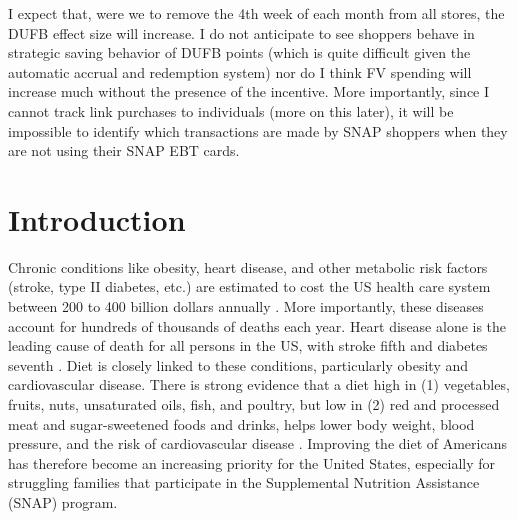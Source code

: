 \documentclass[12pt,letterpaperpaper,]{book}
\begin{document}
I expect that, were we to remove the 4th week of each month from all
stores, the DUFB effect size will increase. I do not anticipate to see
shoppers behave in strategic saving behavior of DUFB points (which is
quite difficult given the automatic accrual and redemption system) nor
do I think FV spending will increase much without the presence of the
incentive. More importantly, since I cannot track link purchases to
individuals (more on this later), it will be impossible to identify
which transactions are made by SNAP shoppers when they are not using
their SNAP EBT cards.

\section*{Introduction}\label{intro-1}

Chronic conditions like obesity, heart disease, and other metabolic risk
factors (stroke, type II diabetes, etc.) are estimated to cost the US
health care system between 200 to 400 billion dollars annually
\citep{cawley_medical_2012, chatterjee_checkup_2014}. More importantly,
these diseases account for hundreds of thousands of deaths each year.
Heart disease alone is the leading cause of death for all persons in the
US, with stroke fifth and diabetes seventh
\citep{national_center_for_health_statistics_health_2015}. Diet is
closely linked to these conditions, particularly obesity and
cardiovascular disease. There is strong evidence that a diet high in (1)
vegetables, fruits, nuts, unsaturated oils, fish, and poultry, but low
in (2) red and processed meat and sugar-sweetened foods and drinks,
helps lower body weight, blood pressure, and the risk of cardiovascular
disease
\citep{mente_systematic_2009, nutrition_evidence_library_series_2014}.
Improving the diet of Americans has therefore become an increasing
priority for the United States, especially for struggling families that
participate in the Supplemental Nutrition Assistance (SNAP) program.
\end{document}
